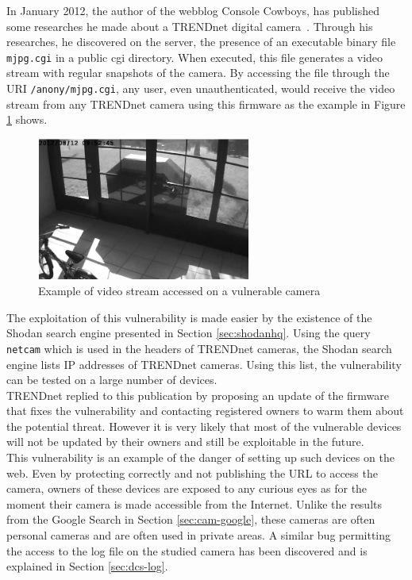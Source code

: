 In January 2012, the author of the webblog Console Cowboys, has published some researches he made about a TRENDnet digital camera~\cite{trendnet-hack}.
Through his researches, he discovered on the server, the presence of an executable binary file \texttt{mjpg.cgi} in a public cgi directory.
When executed, this file generates a video stream with regular snapshots of the camera.
By accessing the file through the URI \texttt{/anony/mjpg.cgi}, any user, even unauthenticated, would receive the video stream from any TRENDnet camera using this firmware as the example in Figure \ref{fig:trendnet-hack} shows.\\

\begin{figure}[h]
  \centering
  \includegraphics[width=7cm]{images/trendnet-hack2.png}
  \caption{Example of video stream accessed on a vulnerable camera}
  \label{fig:trendnet-hack}
\end{figure}

The exploitation of this vulnerability is made easier by the existence of the Shodan search engine presented in Section \ref{sec:shodanhq}.
Using the query \texttt{netcam} which is used in the headers of TRENDnet cameras, the Shodan search engine lists IP addresses of TRENDnet cameras.
Using this list, the vulnerability can be tested on a large number of devices.\\

TRENDnet replied to this publication by proposing an update of the firmware that fixes the vulnerability and contacting registered owners to warm them about the potential threat.
However it is very likely that most of the vulnerable devices will not be updated by their owners and still be exploitable in the future.\\

This vulnerability is an example of the danger of setting up such devices on the web.
Even by protecting correctly and not publishing the URL to access the camera, owners of these devices are exposed to any curious eyes as for the moment their camera is made accessible from the Internet.
Unlike the results from the Google Search in Section \ref{sec:cam-google}, these cameras are often personal cameras and are often used in private areas.
A similar bug permitting the access to the log file on the studied camera has been discovered and is explained in Section \ref{sec:dcs-log}.
